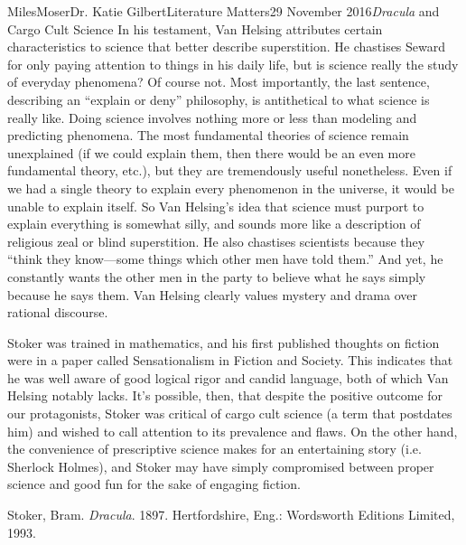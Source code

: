 \documentclass[12pt,letterpaper]{article}
\begin{document}
\begin{mla}{Miles}{Moser}{Dr. Katie Gilbert}{Literature Matters}{29 November 2016}{\textit{Dracula} and Cargo Cult Science}
In his testament, Van Helsing attributes certain characteristics to science that better describe superstition. He chastises Seward for only paying attention to things in his daily life, but is science really the study of everyday phenomena? Of course not. Most importantly, the last sentence, describing an “explain or deny” philosophy, is antithetical to what science is really like. Doing science involves nothing more or less than modeling and predicting phenomena. The most fundamental theories of science remain unexplained (if we could explain them, then there would be an even more fundamental theory, etc.), but they are tremendously useful nonetheless. Even if we had a single theory to explain every phenomenon in the universe, it would be unable to explain itself. So Van Helsing’s idea that science must purport to explain everything is somewhat silly, and sounds more like a description of religious zeal or blind superstition. He also chastises scientists because they “think they know—some things which other men have told them.” And yet, he constantly wants the other men in the party to believe what he says simply because he says them. Van Helsing clearly values mystery and drama over rational discourse.

Stoker was trained in mathematics, and his first published thoughts on fiction were in a paper called Sensationalism in Fiction and Society. This indicates that he was well aware of good logical rigor and candid language, both of which Van Helsing notably lacks. It’s possible, then, that despite the positive outcome for our protagonists, Stoker was critical of cargo cult science (a term that postdates him) and wished to call attention to its prevalence and flaws. On the other hand, the convenience of prescriptive science makes for an entertaining story (i.e. Sherlock Holmes), and Stoker may have simply compromised between proper science and good fun for the sake of engaging fiction.

\begin{workscited}
\bibent
Stoker, Bram. \textit{Dracula}. 1897. Hertfordshire, Eng.: Wordsworth Editions Limited, 1993.
\end{workscited}
\end{mla}
\end{document}
